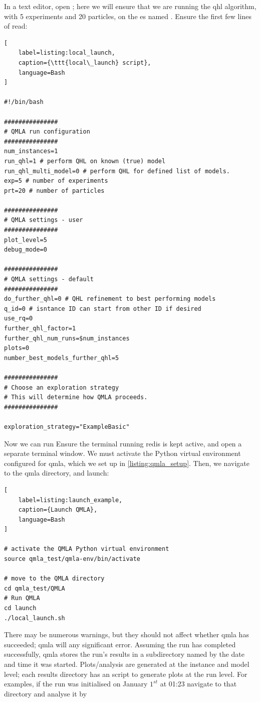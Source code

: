 In a text editor, open ; 
    here we will ensure that we are running the \gls{qhl} algorithm, 
    with 5 experiments and 20 particles, on the \gls{es} named .
Ensure the first few lines of  read:

\begin{lstlisting}[
    label=listing:local_launch,
    caption={\ttt{local\_launch} script},
    language=Bash
]
    
#!/bin/bash

###############
# QMLA run configuration
###############
num_instances=1
run_qhl=1 # perform QHL on known (true) model
run_qhl_multi_model=0 # perform QHL for defined list of models.
exp=5 # number of experiments
prt=20 # number of particles

###############
# QMLA settings - user
###############
plot_level=5
debug_mode=0

###############
# QMLA settings - default
###############
do_further_qhl=0 # QHL refinement to best performing models 
q_id=0 # isntance ID can start from other ID if desired
use_rq=0
further_qhl_factor=1
further_qhl_num_runs=$num_instances
plots=0
number_best_models_further_qhl=5

###############
# Choose an exploration strategy 
# This will determine how QMLA proceeds. 
###############

exploration_strategy="ExampleBasic"
\end{lstlisting}    

Now we can run 
Ensure the terminal running redis is kept active, and open a separate terminal window. 
We must activate the Python virtual environment configured for \gls{qmla}, 
which we set up in \cref{listing:qmla_setup}. 
Then, we navigate to the \gls{qmla} directory, and launch:
\begin{lstlisting}[
    label=listing:launch_example,
    caption={Launch QMLA},
    language=Bash
]

# activate the QMLA Python virtual environment 
source qmla_test/qmla-env/bin/activate

# move to the QMLA directory 
cd qmla_test/QMLA
# Run QMLA
cd launch   
./local_launch.sh

\end{lstlisting}

There may be numerous warnings, but they should not affect whether \gls{qmla} has succeeded; 
    \gls{qmla} will  any significant error. 
Assuming the run has completed successfully, \gls{qmla} stores the run's results in a subdirectory
    named by the date and time it was started.  
Plots/analysis are generated at the \gls{instance} and \gls{model} level;
    each results directory has an  script to generate plots at the \gls{run} level. 
For examples, if the run was initialised on January $1^{st}$ at 01:23 navigate to that directory and analyse it by

